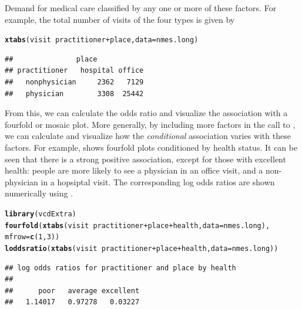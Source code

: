 \documentclass[11pt]{book}\usepackage[]{graphicx}\usepackage[]{color}
\makeatletter
\newcommand{\hlnum}[1]{\textcolor[rgb]{0.686,0.059,0.569}{#1}}%
\newcommand{\hlopt}[1]{\textcolor[rgb]{0,0,0}{#1}}%
\newcommand{\hlstd}[1]{\textcolor[rgb]{0.345,0.345,0.345}{#1}}%
\newcommand{\hlkwc}[1]{\textcolor[rgb]{0.333,0.667,0.333}{#1}}%
\newcommand{\hlkwd}[1]{\textcolor[rgb]{0.737,0.353,0.396}{\textbf{#1}}}%
\newenvironment{kframe}{%
 \def\at@end@of@kframe{}%
 \ifinner\ifhmode%
  \def\at@end@of@kframe{\end{minipage}}%
  \begin{minipage}{\columnwidth}%
 \fi\fi%
 \def\FrameCommand##1{\hskip\@totalleftmargin \hskip-\fboxsep
 \colorbox{shadecolor}{##1}\hskip-\fboxsep
     \hskip-\linewidth \hskip-\@totalleftmargin \hskip\columnwidth}%
 \MakeFramed {\advance\hsize-\width
   \@totalleftmargin\z@ \linewidth\hsize
   \@setminipage}}%
 {\par\unskip\endMakeFramed%
 \at@end@of@kframe}
\newenvironment{knitrout}{}{} %
\renewenvironment{knitrout}{\small\renewcommand{\baselinestretch}{.85}}{} %
\makeatother
\begin{document}
\begin{Example}[nmes4]{Demand for medical care}
classified by any one or more of these factors.  For example, the total number of visits of the four
types is given by 
\begin{knitrout}
\color{fgcolor}\begin{kframe}
\begin{alltt}
\hlkwd{xtabs}\hlstd{(visit} \hlopt{~} \hlstd{practitioner} \hlopt{+} \hlstd{place,} \hlkwc{data}\hlstd{=nmes.long)}
\end{alltt}
\begin{verbatim}
##               place
## practitioner   hospital office
##   nonphysician     2362   7129
##   physician        3308  25442
\end{verbatim}
\end{kframe}
\end{knitrout}
From this, we can calculate the odds ratio and visualize the association with a fourfold or
mosaic plot. More generally, by including more factors in the call to , we can 
calculate and visualize how the \emph{conditional} association varies with these factors.
For example,  shows fourfold plots conditioned by health status.
It can be seen that there is a strong positive association, except for those with
excellent health: people are more likely to see a physician in an office visit, and a
non-physician in a hopsiptal visit. The corresponding log odds ratios are shown numerically
using .

\begin{knitrout}
\color{fgcolor}\begin{kframe}
\begin{alltt}
\hlkwd{library}\hlstd{(vcdExtra)}
\hlkwd{fourfold}\hlstd{(}\hlkwd{xtabs}\hlstd{(visit} \hlopt{~} \hlstd{practitioner} \hlopt{+} \hlstd{place} \hlopt{+} \hlstd{health,} \hlkwc{data}\hlstd{=nmes.long),}
         \hlkwc{mfrow}\hlstd{=}\hlkwd{c}\hlstd{(}\hlnum{1}\hlstd{,}\hlnum{3}\hlstd{))}
\hlkwd{loddsratio}\hlstd{(}\hlkwd{xtabs}\hlstd{(visit} \hlopt{~} \hlstd{practitioner} \hlopt{+} \hlstd{place} \hlopt{+} \hlstd{health,} \hlkwc{data}\hlstd{=nmes.long))}
\end{alltt}
\begin{verbatim}
## log odds ratios for practitioner and place by health 
## 
##      poor   average excellent 
##   1.14017   0.97278   0.03227
\end{verbatim}
\end{kframe}\begin{figure}[!htbp]



\end{figure}
\end{knitrout}
\end{Example}
\end{document}
